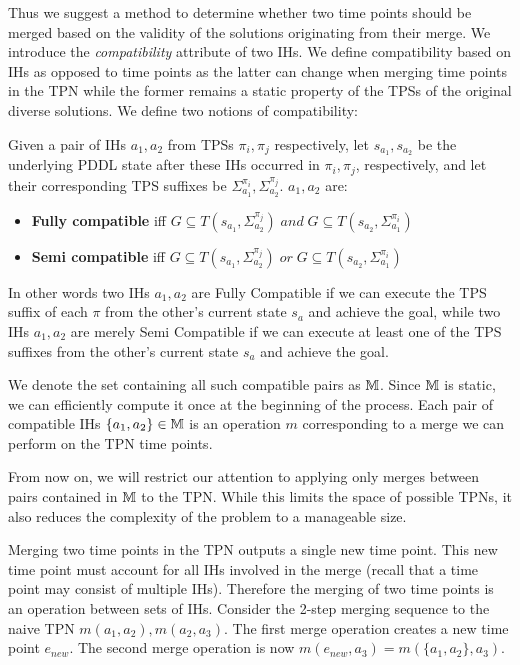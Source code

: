 Thus we suggest a method to determine whether two time points should be merged based on the validity of the solutions originating from their merge.
We introduce the {\em compatibility} attribute of two IHs. We define compatibility based on IHs as opposed to time points as the latter can change when merging time points in the TPN while the former remains a static property of the TPSs of the original diverse solutions.
We define two notions of compatibility:
\begin{definition}
Given a pair of IHs $a_1,a_2$ from TPSs $\pi_i,\pi_j$ respectively, 
let $s_{a_1},s_{a_2}$ be 
the underlying PDDL state after these IHs occurred in $\pi_i,\pi_j$, respectively, and let their corresponding TPS suffixes be $\Sigma^{\pi_i}_{a_1}, \Sigma^{\pi_j}_{a_2}$.
$a_1,a_2$ are:
\begin{itemize}
    \item \textbf{Fully compatible} iff $G \subseteq T(s_{a_1},\Sigma^{\pi_j}_{a_2}) \; and \; G \subseteq T(s_{a_2},\Sigma^{\pi_i}_{a_1})$
    \item  \textbf{Semi compatible} iff $G \subseteq T(s_{a_1},\Sigma^{\pi_j}_{a_2}) \;  or \;  G \subseteq T(s_{a_2},\Sigma^{\pi_i}_{a_1})$
\end{itemize}
\end{definition}

In other words two IHs $a_1,a_2$ are Fully Compatible if we can execute the TPS suffix of each $\pi$ from the other's current state $s_a$ and achieve the goal, while two IHs $a_1,a_2$ are merely Semi Compatible if we can execute at least one of the TPS suffixes from the other's current state $s_a$ and achieve the goal.

We denote the set containing all such compatible pairs as $\mathbb{M}$. Since $\mathbb{M}$ is static, we can efficiently compute it once at the beginning of the process.
Each pair of compatible IHs $\{a_1,a_2\} \in \mathbb{M}$ is an operation $m$ corresponding to a merge we can perform on the TPN time points. 

From now on, we will restrict our attention to applying only merges between pairs contained in $\mathbb{M}$ to the TPN. While this limits the space of possible TPNs, it also reduces the complexity of the problem to a manageable size.

Merging two time points in the TPN outputs a single new time point. This new time point must account for all IHs involved in the merge (recall that a time point may consist of multiple IHs). Therefore the merging of two time points is an operation between sets of IHs. Consider the 2-step merging sequence to the naive TPN $m(a_1,a_2),m(a_2,a_3)$. The first merge operation creates a new time point $e_{new}$. The second merge operation is now $m(e_{new},a_3)=m(\{a_1,a_2\},a_3)$.

